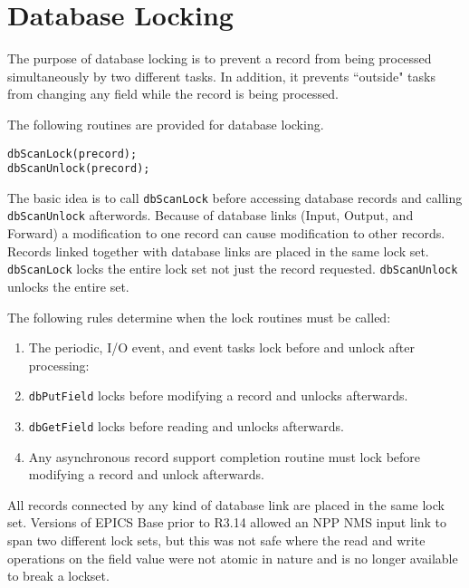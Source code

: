 \section{Database Locking}

The purpose of database locking is to prevent a record from being processed simultaneously by two different tasks. In 
addition, it prevents ``outside" tasks from changing any field while the record is being processed.

The following routines are provided for database locking.

\begin{verbatim}dbScanLock(precord);
dbScanUnlock(precord);
\end{verbatim}
The basic idea is to call \verb|dbScanLock| before accessing database records and calling \verb|dbScanUnlock| afterwords. 
Because of database links (Input, Output, and Forward) a modification to one record can cause modification to other 
records. Records linked together with database links are placed in the same lock set. \verb|dbScanLock| locks the entire lock 
set not just the record requested. \verb|dbScanUnlock| unlocks the entire set.

The following rules determine when the lock routines must be called:

\begin{enumerate}\item The periodic, I/O event, and event tasks lock before and unlock after processing:

\item \verb|dbPutField| locks before modifying a record and unlocks afterwards.

\item \verb|dbGetField| locks before reading and unlocks afterwards.

\item Any asynchronous record support completion routine must lock before modifying a record and unlock afterwards.

\end{enumerate}
All records connected by any kind of database link are placed in the same lock set. Versions of EPICS Base prior to R3.14 
allowed an NPP NMS input link to span two different lock sets, but this was not safe where the read and write operations 
on the field value were not atomic in nature and is no longer available to break a lockset.


